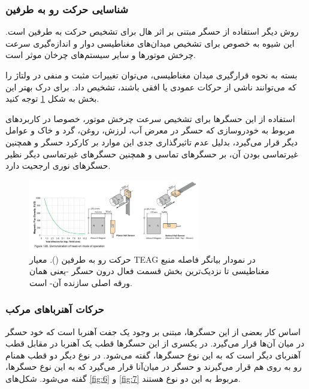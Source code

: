 \documentclass[conference]{IEEEtran-ModifiedForMVIP}
\begin{document}
\subsubsection{شناسایی حرکت رو به طرفین}


روش دیگر استفاده از حسگر مبتنی بر اثر هال برای تشخیص حرکت به طرفین است. این شیوه به خصوص برای تشخیص میدان‌های مغناطیسی دوار و اندازه‌گیری سرعت چرخش موتور‌ها و سایر سیستم‌های چرخان موثر است.

بسته به نحوه قرارگیری میدان مغناطیسی، می‌توان تغییرات مثبت و منفی در ولتاژ را که می‌توانند ناشی از حرکات عمودی یا افقی باشند، تشخیص داد. برای درک بهتر این بخش به شکل
\ref{fig:5}
توجه کنید.

استفاده از این حسگر‌ها برای تشخیص سرعت چرخش موتور، خصوصا در کاربردهای مربوط به خودروسازی که حسگر در معرض آب، لرزش، روغن، گرد و خاک و عوامل دیگر قرار می‌گیرد، بدلیل عدم تاثیرگذاری جدی این موارد بر کارکرد حسگر و همچنین غیرتماسی بودن آن، بر حسگر‌های تماسی و همچنین حسگر‌های غیرتماسی دیگر نظیر حسگر‌های نوری ارجحیت دارد. \cite{ele_hall_2013}

	
\begin{figure}[t]
	
	\centering 
	\includegraphics[width=75mm]{Images/side}
	\caption{حرکت رو به طرفین ().
		معیار TEAG در نمودار بیانگر فاصله منبع مغناطیسی تا نزدیک‌ترین بخش قسمت فعال درون حسگر -یعنی همان ورقه اصلی سازنده آن- است.
		\cite{alleg}	
	}\label{fig:5}
\end{figure}


\subsubsection{حرکات آهنربا‌های مرکب}

اساس کار بعضی از این حسگرها، مبتنی بر وجود یک جفت آهنربا است که خود حسگر در میان آن‌ها قرار می‌گیرد. در یکسری از این حسگر‌ها قطب  یک آهنربا در مقابل قطب  آهنربای دیگر است که به این نوع حسگر‌ها،  گفته می‌شود. در نوع دیگر دو قطب همنام  رو به روی هم قرار می‌گیرند و حسگر در میان‌آنا قرار می‌گیرد که به این نوع حسگر‌ها،  گفته می‌شود. شکل‌های 
\ref{fig:6}
و
\ref{fig:7}
مربوط به این دو نوع هستند. \cite{alleg}
\end{document}
